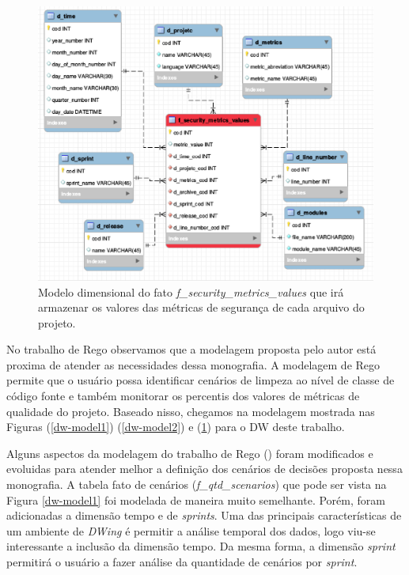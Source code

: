  

 \begin{figure}[H]
 	\centering
 		\includegraphics[scale=0.5]{figuras/dw-fato-security-metrics}
 		\caption{Modelo dimensional do fato \emph{f\_security\_metrics\_values} que irá armazenar os valores das métricas de segurança de cada arquivo do projeto.}
 		\label{dw-model3}
 \end{figure}


No trabalho de Rego \citeyear{rego2014} observamos que a modelagem proposta pelo autor está proxima de atender as necessidades dessa monografia. A modelagem de Rego \citeyear{rego2014} permite que o usuário possa identificar cenários de limpeza ao nível de classe de código fonte e também monitorar os percentis dos valores de métricas de qualidade do projeto. Baseado nisso, chegamos na modelagem mostrada nas Figuras (\ref{dw-model1}) (\ref{dw-model2}) e (\ref{dw-model3}) para o DW deste trabalho.

Alguns aspectos da modelagem do trabalho de Rego (\citeyear{rego2014}) foram modificados e evoluidas para atender melhor a definição dos cenários de decisões proposta nessa monografia. A tabela fato de cenários (\emph{f\_qtd\_scenarios}) que pode ser vista na Figura \ref{dw-model1}  foi modelada de maneira muito semelhante. Porém, foram adicionadas a dimensão tempo e de \emph{sprints}. Uma das principais características de um ambiente de \emph{DWing} é permitir a análise temporal dos dados, logo viu-se interessante a inclusão da dimensão tempo. Da mesma forma, a dimensão \emph{sprint} permitirá o usuário a fazer análise da quantidade de cenários por \emph{sprint}. 

